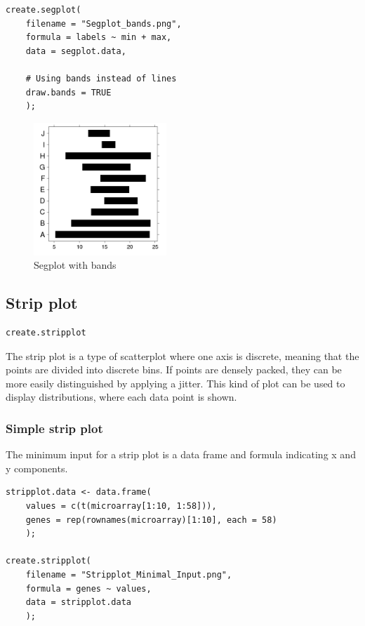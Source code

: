 \documentclass[letterpaper]{article}
\begin{document}
\begin{verbatim}
create.segplot(
    filename = "Segplot_bands.png",
    formula = labels ~ min + max,
    data = segplot.data,
    
    # Using bands instead of lines
    draw.bands = TRUE
    );
\end{verbatim}

\begin{figure}[!ht]
  \begin{center}
     \includegraphics[width=50mm]{Figures/Segplot_bands.png}
     \caption{Segplot with bands}
  \end{center}
\end{figure}

\subsection{Strip plot}
\begin{verbatim}
create.stripplot
\end{verbatim}

The strip plot is a type of scatterplot where one axis is discrete, meaning that the points are divided into discrete bins. If points are densely packed, they can be more easily distinguished by applying a jitter. This kind of plot can be used to display distributions, where each data point is shown.

\subsubsection{Simple strip plot}
The minimum input for a strip plot is a data frame and formula indicating x and y components.
\begin{verbatim}
stripplot.data <- data.frame(
    values = c(t(microarray[1:10, 1:58])),
    genes = rep(rownames(microarray)[1:10], each = 58)
    );

create.stripplot(
    filename = "Stripplot_Minimal_Input.png",
    formula = genes ~ values,
    data = stripplot.data
    );
\end{verbatim}
\end{document}
